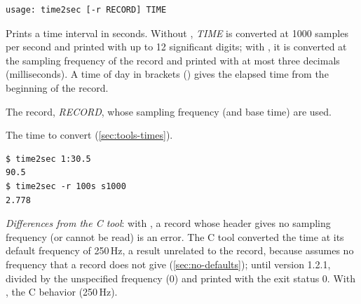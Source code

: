 \begin{lstlisting}[style=signature,language={}]
usage: time2sec [-r RECORD] TIME
\end{lstlisting}
Prints a time interval in seconds. Without , \textit{TIME} is converted at
1000 samples per second and printed with up to 12 significant digits; with , it is
converted at the sampling frequency of the record and printed with at most three decimals
(milliseconds). A time of day in brackets (\code{[9:0:0]}) gives the elapsed time from the
beginning of the record.
\begin{params}
\item[-r] The record, \textit{RECORD}, whose sampling frequency (and base time) are used.
\item[TIME] The time to convert (\cref{sec:tools-times}).
\end{params}
\begin{lstlisting}[style=text]
$ time2sec 1:30.5
90.5
$ time2sec -r 100s s1000
2.778
\end{lstlisting}
\textit{Differences from the C tool}: with , a record whose header gives no
sampling frequency (or cannot be read) is an error. The C tool converted the time at its
default frequency of 250\,Hz, a result unrelated to the record, because \wfdbx{} assumes no
frequency that a record does not give (\cref{sec:no-defaults}); until version 1.2.1,
\wfdbx{} divided by the unspecified frequency (0) and printed 
with the exit status 0. With , the C behavior (250\,Hz).

